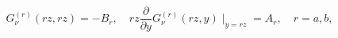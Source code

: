 \begin{equation}
G_{\nu }^{(r)}(rz,rz)=-B_{r},\quad rz\frac{\partial }{\partial y}G_{\nu
}^{(r)}(rz,y)\mid _{y=rz}=A_{r},\quad r=a,b,  \label{Grelab}
\end{equation}

